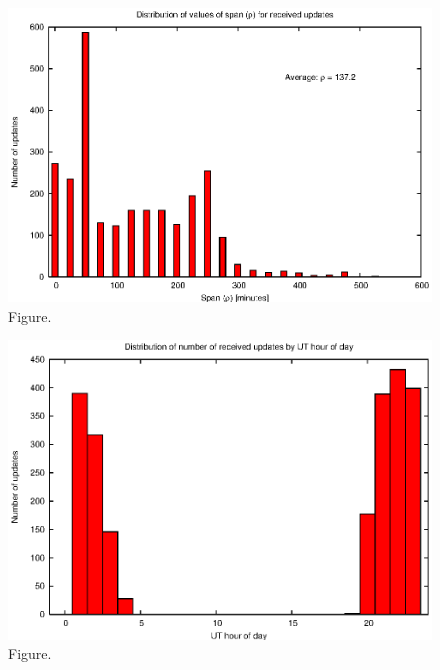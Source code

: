 \documentclass[12pt,a4paper]{article}
\begin{document}
\begin{figure}[htbp]
 \begin{center}
  \includegraphics[scale=1.0, angle=0]{figures/vol_span.eps}
 \end{center}
  \caption[Figure.]
{Figure.}
\end{figure}
\clearpage
\begin{figure}[htbp]
 \begin{center}
  \includegraphics[scale=1.0, angle=0]{figures/vol_ut.eps}
 \end{center}
  \caption[Figure.]
{Figure.}
\end{figure}
\end{document}
